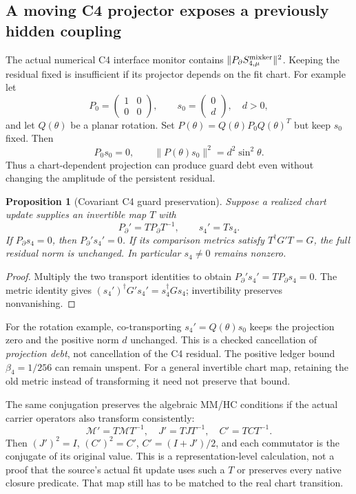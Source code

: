 \documentclass[11pt,a4paper]{article}
\newtheorem{proposition}{Proposition}
\begin{document}
\subsection{A moving C4 projector exposes a previously hidden coupling}
The actual numerical C4 interface monitor contains
$\|P_\partial S_{4,\mu}^{\rm mixker}\|^2$.
Keeping the residual fixed is insufficient if its projector depends on
the fit chart. For example let
\[
 P_0=\begin{pmatrix}1&0\\0&0\end{pmatrix},\qquad
 s_0=\begin{pmatrix}0\\d\end{pmatrix},\quad d>0,
\]
and let $Q(\theta)$ be a planar rotation. Set
$P(\theta)=Q(\theta)P_0Q(\theta)^T$ but keep $s_0$ fixed. Then
\[
 P_0s_0=0,\qquad
 \|P(\theta)s_0\|^2=d^2\sin^2\theta.
\]
Thus a chart-dependent projection can produce guard debt even without
changing the amplitude of the persistent residual.

\begin{proposition}[Covariant C4 guard preservation]
\label{prop:covariant-c4-guard}
Suppose a realized chart update supplies an invertible map $T$ with
\[
 P_\partial'=TP_\partial T^{-1},\qquad s_4'=Ts_4.
\]
If $P_\partial s_4=0$, then $P_\partial's_4'=0$. If its comparison
metrics satisfy $T^\dagger G'T=G$, the full residual norm is unchanged.
In particular $s_4\ne0$ remains nonzero.
\end{proposition}
\begin{proof}
Multiply the two transport identities to obtain
$P_\partial's_4'=TP_\partial s_4=0$.
The metric identity gives
$(s_4')^\dagger G's_4'=s_4^\dagger Gs_4$; invertibility preserves
nonvanishing.
\end{proof}
For the rotation example, co-transporting $s_4'=Q(\theta)s_0$
keeps the projection zero and the positive norm $d$ unchanged. This is
a checked cancellation of \emph{projection debt}, not cancellation of
the C4 residual. The positive ledger bound $\beta_4=1/256$ can remain
unspent. For a general invertible chart map, retaining the old metric
instead of transforming it need not preserve that bound.

The same conjugation preserves the algebraic MM/HC conditions if the
actual carrier operators also transform consistently:
\[
 \mathcal M'=T\mathcal M T^{-1},\quad J'=TJT^{-1},
 \quad C'=TCT^{-1}.
\]
Then $(J')^2=I$, $(C')^2=C'$, $C'=(I+J')/2$, and each commutator
is the conjugate of its original value. This is a representation-level
calculation, not a proof that the source's actual fit update uses such
a $T$ or preserves every native closure predicate. That map still has
to be matched to the real chart transition.
\end{document}
